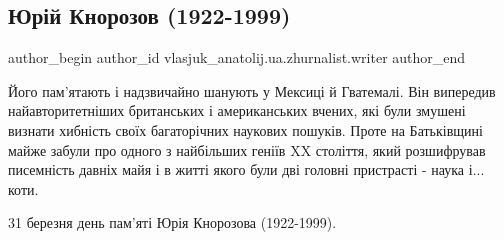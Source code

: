  
 
 
 
 

\subsection{Юрій Кнорозов (1922-1999)}
\label{sec:31_03_2023.fb.vlasjuk_anatolij.ua.zhurnalist.writer.1.yur_i_knorozov__1922}

\ifcmt
 author_begin
   author_id vlasjuk_anatolij.ua.zhurnalist.writer
 author_end
\fi

Його пам'ятають і надзвичайно шанують у Мексиці й Гватемалі. Він випередив
найавторитетніших британських і американських вчених, які були змушені визнати
хибність своїх багаторічних наукових пошуків. Проте на Батьківщині майже забули
про одного з найбільших геніїв XX століття, який розшифрував писемність давніх
майя і в житті якого були дві головні пристрасті - наука і... коти.


31 березня день пам'яті Юрія Кнорозова (1922-1999).
